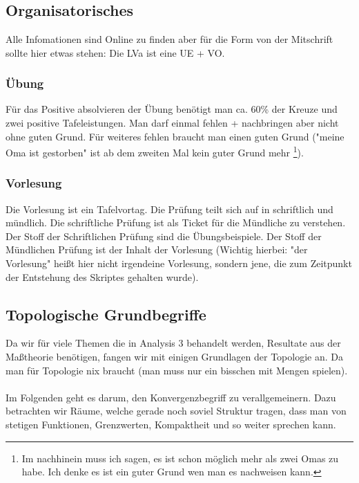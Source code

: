 \chapter{}
\section{Organisatorisches}
Alle Infomationen sind Online zu finden aber für die Form von der Mitschrift sollte hier etwas stehen:
Die LVa ist eine UE + VO. 
\subsection{Übung}
Für das Positive absolvieren der Übung benötigt man ca. 60\% der Kreuze und zwei positive Tafeleistungen.
Man darf einmal fehlen + nachbringen aber nicht ohne guten Grund.
Für weiteres fehlen braucht man einen guten Grund ("meine Oma ist gestorben"
ist ab dem zweiten Mal kein guter Grund mehr
\footnote{Im nachhinein muss ich sagen, es ist schon möglich mehr als zwei Omas zu habe.
 Ich denke es ist ein guter Grund wen man es nachweisen kann.}).
\subsection{Vorlesung}
Die Vorlesung ist ein Tafelvortag. 
Die Prüfung teilt sich auf in schriftlich und mündlich. Die schriftliche Prüfung ist als Ticket für die Mündliche zu verstehen.
Der Stoff der Schriftlichen Prüfung sind die Übungsbeispiele.
Der Stoff der Mündlichen Prüfung ist der Inhalt der Vorlesung (Wichtig hierbei:
"der Vorlesung" heißt hier nicht irgendeine Vorlesung, sondern jene, die zum Zeitpunkt der Entstehung des Skriptes gehalten wurde).

\section{Topologische Grundbegriffe} 

Da wir für viele Themen die in Analysis 3 behandelt werden, Resultate aus der Maßtheorie benötigen,
fangen wir mit einigen Grundlagen der Topologie an. Da man für Topologie nix braucht (man muss nur ein bisschen mit Mengen spielen).
\\ \\
Im Folgenden geht es darum, den Konvergenzbegriff zu verallgemeinern. 
Dazu betrachten wir Räume, welche gerade noch soviel Struktur tragen, dass man von stetigen
Funktionen, Grenzwerten, Kompaktheit und so weiter sprechen kann.

